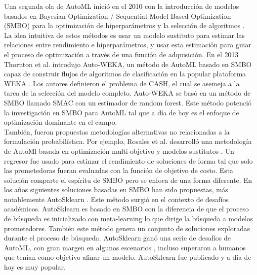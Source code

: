 Una segunda ola de AutoML inició en el 2010 con la introducción de modelos basados en Bayesian Optimization / Sequential Model-Based Optimization (SMBO) para la optimización de hiperparámetros y la selección de algoritmos \parencite{8} \parencite{3}. La idea intuitiva de estos métodos es usar un modelo sustituto para estimar las relaciones entre rendimiento e hiperparámetros, y usar esta estimación para guiar el proceso de optimización a través de una función de adquisición. En el 2013 Thornton et al. introdujo Auto-WEKA, un método de AutoML basado en SMBO capaz de construir flujos de algoritmos de clasificación en la popular plataforma WEKA \parencite{4}. Los autores definieron el problema de CASH, el cual se asemeja a la tarea de la selección del modelo completo. Auto-WEKA se basó en un método de SMBO llamado SMAC \parencite{3} con un estimador de random forest. Este método potenció la investigación en SMBO para AutoML tal que a día de hoy es el enfoque de optimización dominante en el campo. \\

También, fueron propuestas metodologías alternativas no relacionadas a la formulación probabilística. Por ejemplo, Rosales et al. desarrolló una metodología de AutoMl basada en optimización multi-objetivo y modelos sustitutos \parencite{5}. Un regresor fue usado para estimar el rendimiento de soluciones de forma tal que solo las prometedoras fueran evaluadas con la función de objetivo de costo. Esta solución comparte el espíritu de SMBO pero se enfoca de una forma diferente. En los años siguientes soluciones basadas en SMBO han sido propuestas, más notablemente AutoSklearn \parencite{6}. Este método surgió en el contexto de desafíos académicos. AutoSklearn es basado en SMBO con la diferencia de que el proceso de búsqueda es inicializado con meta-learning lo que dirige la búsqueda a modelos prometedores. También este método genera un conjunto de soluciones exploradas durante el proceso de búsqueda. AutoSklearn ganó una serie de desafíos de AutoML, con gran margen en algunos escenarios \parencite{7}, incluso superaron a humanos que tenían como objetivo afinar un modelo. AutoSklearn fue publicado y a día de hoy es muy popular. \\


